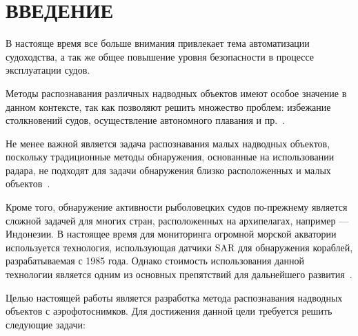 \chapter*{ВВЕДЕНИЕ}

В настояще время все больше внимания привлекает тема автоматизации судоходства, а так же общее повышение уровня безопасности в процессе эксплуатации судов.

Методы распознавания различных надводных объектов имеют особое значение в данном контексте, так как позволяют решить множество проблем: избежание столкновений судов, осуществление автономного плавания и пр.~\cite{ship-detection}.

Не менее важной является задача распознавания малых надводных объектов, поскольку традиционные методы обнаружения, основанные на использовании радара, не подходят для задачи обнаружения близко расположенных и малых объектов~\cite{small-ship-detection}.

Кроме того, обнаружение активности рыболовецких судов по-прежнему является сложной задачей для многих стран, расположенных на архипелагах, например --- Индонезии. В настоящее время для мониторинга огромной морской акватории используется технология, использующая датчики SAR для обнаружения кораблей, разрабатываемая с 1985 года. Однако стоимость использования данной технологии является одним из основных препятствий для дальнейшего развития~\cite{boats-recognition}.

Целью настоящей работы является разработка метода распознавания надводных объектов с аэрофотоснимков. Для достижения данной цели требуется решить следующие задачи:

